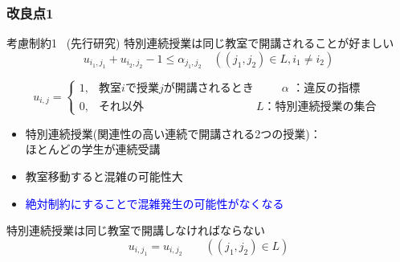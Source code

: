 \documentclass[dvipdfmx,12pt]{beamer}
\begin{document}
\begin{frame}\frametitle{改良点1}
\begin{itembox}[l]{考慮制約1 \ (先行研究)}
特別連続授業は同じ教室で開講されることが好ましい
\vspace{-10pt}
\[u_{i_1,j_1} + u_{i_2,j_2} -1\le \alpha_{j_1,j_2} 
\quad ((j_1,j_2) \in L ,i_1 \neq i_2)\]

\end{itembox}
\vspace{-15pt}
\[
u_{i,j} = \left\{
\begin{array}{ll}
1,& \text{教室$i$で授業$j$が開講されるとき} \hspace{30pt}\alpha\text{ ：違反の指標}\\
0, & \text{それ以外} \hspace{120pt} L \text{：特別連続授業の集合 }
\end{array}
\right.
\]
 

\begin{itemize}
\item 特別連続授業(関連性の高い連続で開講される2つの授業)：\\ほとんどの学生が連続受講\\
\item 教室移動すると混雑の可能性大\\
\item \textcolor{blue}{絶対制約にすることで混雑発生の可能性がなくなる}\\
\end{itemize}
\begin{block}{特別連続授業は同じ教室で開講しなければならない}
\vspace{-5pt}
\[ u_{i,j_1} = u_{i,j_2} \qquad ((j_1,j_2) \in L) \]
\end{block}

\end{frame}
\end{document}
